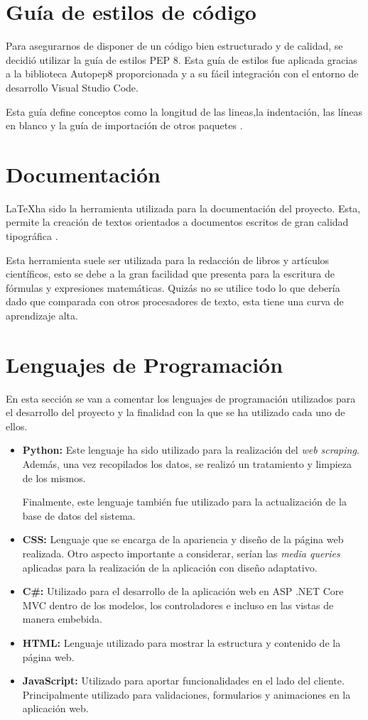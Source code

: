 \section{Guía de estilos de código}
Para asegurarnos de disponer de un código bien estructurado y de calidad, se decidió utilizar la guía de estilos PEP 8. Esta guía de estilos fue aplicada gracias a la biblioteca Autopep8 proporcionada y a su fácil integración con el entorno de desarrollo Visual Studio Code.  

Esta guía define conceptos como la longitud de las lineas,la indentación, las líneas en blanco y la guía de importación de otros paquetes \cite{pep8:latex}.

\section{Documentación}
\LaTeX \quad ha sido la herramienta utilizada para la documentación del proyecto. Esta, permite la creación de textos orientados a documentos escritos de gran calidad tipográfica \cite{latex:latex}.

Esta herramienta suele ser utilizada para la redacción de libros y artículos científicos, esto se debe a la gran facilidad que presenta para la escritura de fórmulas y expresiones matemáticas. Quizás no se utilice todo lo que debería dado que comparada con otros procesadores de texto, esta tiene una curva de aprendizaje alta.


\section{Lenguajes de Programación}
En esta sección se van a comentar los lenguajes de programación utilizados para el desarrollo del proyecto y la finalidad con la que se ha utilizado cada uno de ellos.

\begin{itemize}
    \item \textbf{Python:} Este lenguaje ha sido utilizado para la realización del \textit{web scraping}. Además, una vez recopilados los datos, se realizó un tratamiento y limpieza de los mismos.
    
    Finalmente, este lenguaje también fue utilizado para la actualización de la base de datos del sistema.
    \item \textbf{CSS:} Lenguaje que se encarga de la apariencia y diseño de la página web realizada. Otro aspecto importante a considerar, serían las \textit{media queries} aplicadas para la realización de la aplicación con diseño adaptativo.
    \item \textbf{C\#:} Utilizado para el desarrollo de la aplicación web en ASP .NET Core MVC dentro de los modelos, los controladores e incluso en las vistas de manera embebida.
    \item \textbf{HTML:} Lenguaje utilizado para mostrar la estructura y contenido de la página web.
    \item \textbf{JavaScript:} Utilizado para aportar funcionalidades en el lado del cliente. Principalmente utilizado para validaciones, formularios y animaciones en la aplicación web.
\end{itemize}

